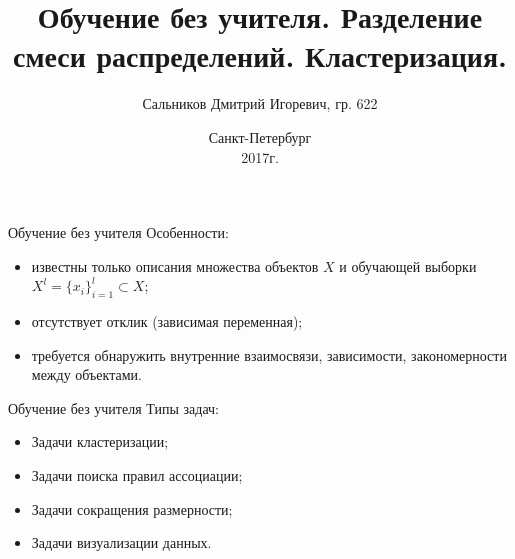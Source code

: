 \documentclass[unicode, notheorems, pdf]{beamer}
\title[Обучение без учителя]{Обучение без учителя. Разделение смеси распределений. Кластеризация.}
\author{Сальников Дмитрий Игоревич, гр. 622}
\institute[СПбГУ]{Санкт-Петербургский государственный университет\\
    Прикладная математика и информатика \\
}
\date{
    {\small Санкт-Петербург\\
    2017г.}
}
\begin{document}
\begin{frame}
    \titlepage
\end{frame}
%
\begin{frame}{Обучение без учителя}
	Особенности:
	\vspace{0.5cm}
	\begin{itemize}
		\item известны только описания множества объектов $X$ и обучающей выборки $X^l = \{x_i\}_{i=1}^l \subset X$;
		\vspace{0.5cm}
		\item отсутствует отклик (зависимая переменная);
		\vspace{0.5cm}
		\item  требуется обнаружить внутренние взаимосвязи, зависимости, закономерности между объектами.
	\end{itemize}
\end{frame}
%
\begin{frame}{Обучение без учителя}
	Типы задач:
	\vspace{0.5cm}
	\begin{itemize}
        \item Задачи кластеризации;
        \vspace{0.5cm}
        \item Задачи поиска правил ассоциации;
        \vspace{0.5cm}
        \item Задачи сокращения размерности;
        \vspace{0.5cm}
        \item Задачи визуализации данных.
    \end{itemize}	
\end{frame}
%
\end{document}
